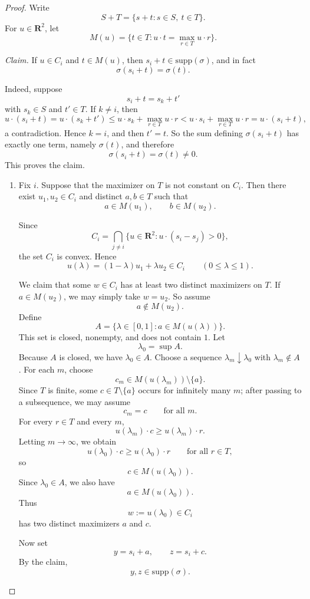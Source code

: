 \begin{proof}
Write
\[
S+T=\{s+t:s\in S,\ t\in T\}.
\]
For $u\in \mathbf{R}^2$, let
\[
M(u)=\{t\in T:u\cdot t=\max_{r\in T}u\cdot r\}.
\]

\medskip
\noindent
\emph{Claim.} If $u\in C_i$ and $t\in M(u)$, then $s_i+t\in \mathrm{supp}(\sigma)$, and in fact
\[
\sigma(s_i+t)=\sigma(t).
\]

\smallskip
\noindent
Indeed, suppose
\[
s_i+t=s_k+t'
\]
with $s_k\in S$ and $t'\in T$. If $k\neq i$, then
\[
u\cdot(s_i+t)=u\cdot(s_k+t')
\le u\cdot s_k+\max_{r\in T}u\cdot r
< u\cdot s_i+\max_{r\in T}u\cdot r
= u\cdot(s_i+t),
\]
a contradiction. Hence $k=i$, and then $t'=t$. So the sum defining $\sigma(s_i+t)$ has exactly one term, namely $\sigma(t)$, and therefore
\[
\sigma(s_i+t)=\sigma(t)\neq 0.
\]
This proves the claim.

\begin{enumerate}
\item[(a)] Fix $i$. Suppose that the maximizer on $T$ is not constant on $C_i$. Then there exist $u_1,u_2\in C_i$ and distinct $a,b\in T$ such that
\[
a\in M(u_1),
\qquad
b\in M(u_2).
\]

Since
\[
C_i=\bigcap_{j\neq i}\{u\in \mathbf{R}^2:u\cdot(s_i-s_j)>0\},
\]
the set $C_i$ is convex. Hence
\[
u(\lambda)=(1-\lambda)u_1+\lambda u_2\in C_i
\qquad
(0\le \lambda\le 1).
\]

We claim that some $w\in C_i$ has at least two distinct maximizers on $T$. If $a\in M(u_2)$, we may simply take $w=u_2$. So assume
\[
a\notin M(u_2).
\]
Define
\[
A=\{\lambda\in[0,1]:a\in M(u(\lambda))\}.
\]
This set is closed, nonempty, and does not contain $1$. Let
\[
\lambda_0=\sup A.
\]
Because $A$ is closed, we have $\lambda_0\in A$. Choose a sequence $\lambda_m\downarrow \lambda_0$ with $\lambda_m\notin A$. For each $m$, choose
\[
c_m\in M(u(\lambda_m))\setminus\{a\}.
\]
Since $T$ is finite, some $c\in T\setminus\{a\}$ occurs for infinitely many $m$; after passing to a subsequence, we may assume
\[
c_m=c
\qquad
\mbox{for all } m.
\]
For every $r\in T$ and every $m$,
\[
u(\lambda_m)\cdot c\ge u(\lambda_m)\cdot r.
\]
Letting $m\to\infty$, we obtain
\[
u(\lambda_0)\cdot c\ge u(\lambda_0)\cdot r
\qquad
\mbox{for all } r\in T,
\]
so
\[
c\in M(u(\lambda_0)).
\]
Since $\lambda_0\in A$, we also have
\[
a\in M(u(\lambda_0)).
\]
Thus
\[
w:=u(\lambda_0)\in C_i
\]
has two distinct maximizers $a$ and $c$.

Now set
\[
y=s_i+a,
\qquad
z=s_i+c.
\]
By the claim,
\[
y,z\in \mathrm{supp}(\sigma).
\]


\end{enumerate}
\end{proof}
